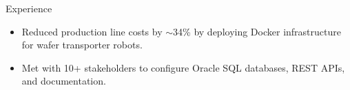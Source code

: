 \documentclass{resume} %
\begin{document}
\begin{workSection}{Experience}
	\experienceItem[
	company=Texas Instruments,
	location=Dallas{,} TX,
	position=Information Technology Intern,
	duration= May 2024 - August 2024,
	]
	\begin{itemize}
		\vspace{-0.5em}
		\itemsep -6pt {}
		\item Reduced production line costs by $\sim$34\% by deploying Docker infrastructure for wafer transporter robots.
		\item Met with {10+} stakeholders to configure {Oracle SQL} databases, {REST APIs}, and documentation.
	\end{itemize}
	
	\experienceItem[
	company=GNOME Foundation,
	location=Remote,
	position=Open-Source Contributor,
	duration=December 2023 {-} June 2024
	]
	\begin{itemize}
		\vspace{-0.5em}
		\itemsep -6pt {}


\end{itemize}
\end{workSection}
\end{document}
